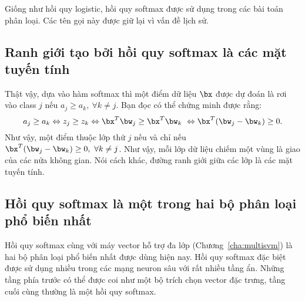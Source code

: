  {Giống như hồi quy logistic, hồi quy softmax được sử dụng trong các bài toán
phân loại}. Các tên gọi này được giữ lại vì vấn đề lịch sử.

 
\subsection{Ranh giới tạo bởi hồi quy softmax là các mặt tuyến tính}
Thật vậy, dựa vào hàm softmax thì một điểm dữ liệu $\bx$ được dự đoán là rơi vào class $j$ nếu $a_{j} \geq a_{k}, ~\forall k \neq j$. Bạn đọc có thể chứng minh được rằng:
\begin{equation} 
a_{j} \geq a_{k} \Leftrightarrow z_{j} \geq z_{k} \Leftrightarrow \bx^T\bw_j \geq \bx^T\bw_k\\\
\Leftrightarrow \bx^T(\bw_j - \bw_k) \geq 0.
\end{equation} 
Như vậy, một điểm thuộc lớp thứ $j$ nếu và chỉ nếu $\bx^T(\bw_j - \bw_k) \geq
0,~\forall k \neq j$. Như vậy, mỗi lớp dữ liệu chiếm một vùng là giao
của các nửa không gian. Nói cách khác, đường ranh giới giữa các lớp là các
mặt tuyến tính. 
 
 
\subsection{Hồi quy softmax là một trong hai bộ phân loại phổ biến nhất}
Hồi quy softmax cùng với máy vector hỗ trợ đa lớp
(Chương~\ref{cha:multisvm}) là hai bộ phân loại phổ biến nhất được dùng hiện nay.
Hồi quy softmax đặc biệt được sử dụng nhiều trong các mạng neuron sâu với
rất nhiều tầng ẩn. Những tầng phía trước có thể được coi như một bộ trích chọn 
vector đặc trưng, tầng cuối cùng thường là một hồi quy softmax.
 
